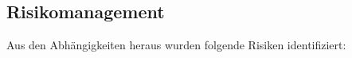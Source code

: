 \begin{landscape}
\begin{flushleft}
    \section{Risikomanagement}
    Aus den Abhängigkeiten heraus wurden folgende Risiken identifiziert:
\begin{table}[H]
\end{table}
\end{flushleft}
\end{landscape}
